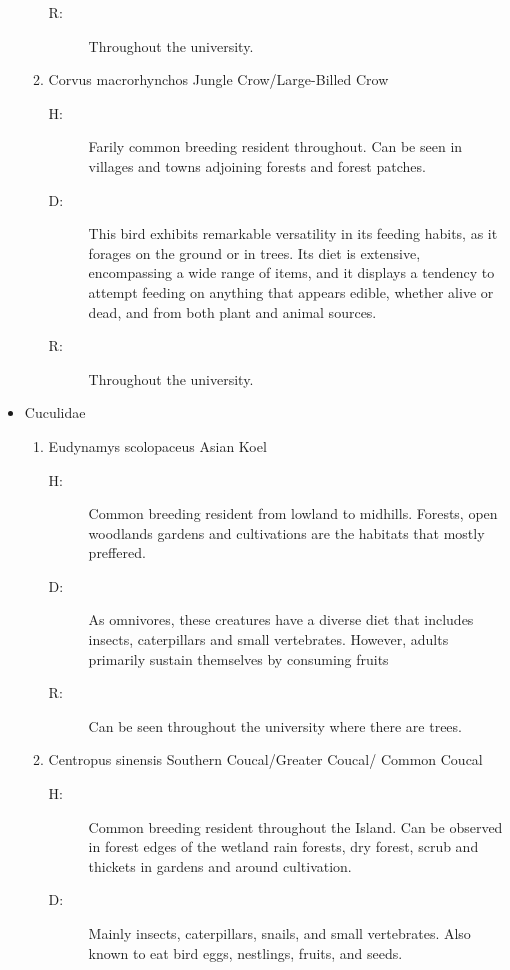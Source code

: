 \begin{itemize}
\begin{enumerate}
\begin{description}
\item[R: ]%
Throughout the university. %
\end{description}%
\item%
Corvus macrorhynchos\newline%
Jungle Crow/Large{-}Billed Crow%
\begin{description}%
\item[H: ]%
Farily common breeding resident throughout. Can be seen in villages and towns adjoining forests and forest patches.%
\item[D: ]%
This bird exhibits remarkable versatility in its feeding habits, as it forages on the ground or in trees. Its diet is extensive, encompassing a wide range of items, and it displays a tendency to attempt feeding on anything that appears edible, whether alive or dead, and from both plant and animal sources.%
\item[R: ]%
Throughout the university. %
\end{description}%
\end{enumerate}%
\item%
Cuculidae%
\begin{enumerate}%
\item%
Eudynamys scolopaceus\newline%
Asian Koel%
\begin{description}%
\item[H: ]%
Common breeding resident from lowland to midhills. Forests, open woodlands gardens and cultivations are the habitats that mostly preffered.%
\item[D: ]%
As omnivores, these creatures have a diverse diet that includes insects, caterpillars and small vertebrates. However, adults primarily sustain themselves by consuming fruits%
\item[R: ]%
Can be seen throughout the university where there are trees.%
\end{description}%
\item%
Centropus sinensis\newline%
Southern Coucal/Greater Coucal/ Common Coucal%
\begin{description}%
\item[H: ]%
Common breeding resident throughout the Island. Can be observed in forest edges of the wetland rain forests, dry forest, scrub and thickets in gardens and around cultivation.%
\item[D: ]%
Mainly  insects, caterpillars, snails, and small vertebrates. Also known to eat bird eggs, nestlings, fruits, and seeds.%

\end{description}
\end{enumerate}
\end{itemize}

